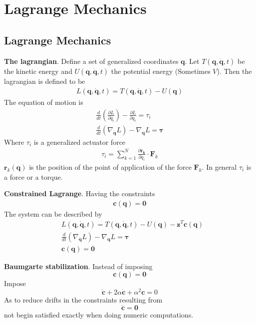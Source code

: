 \setcounter{section}{3}
\section{Lagrange Mechanics}
\setcounter{section}{8}
\setcounter{subsection}{1}
\subsection{Lagrange Mechanics} %

\textbf{The lagrangian}. Define a set of generalized coordinates \(\bm{q}\). Let
 \(T(\bm{q},\dot{\bm{q}},t)\) be the kinetic energy and 
\(U(\bm{q},\bm{\dot{q}},t)\) the potential energy (Sometimes \(V\)). Then the lagrangian is
defined to be
\begin{align*}
    L(\bm{q},\dot{\bm{q}},t) = T(\bm{q},\dot{\bm{q}},t)-U(\bm{q})
\end{align*}
The equation of motion is
\begin{align*}
    \frac{d}{dt}\left(\frac{\partial L}{\partial \dot{q_i}}\right) - \frac{\partial L}{\partial q_i} = \tau_i \\
    \frac{d}{dt}\left(\nabla_{\dot{\bm{q}}}L\right) - \nabla_{\bm{q}}L = \bm{\tau}
\end{align*}
Where \(\tau_i\) is a generalized actuator force
\begin{align*}
    \tau_i = \sum_{k=1}^{N}\frac{\partial \bm{r_k}}{\partial q_i} \cdot \bm{F}_k
\end{align*}
\(\bm{r}_k(\bm{q})\) is the position of the point of application of the force \(\bm{F}_k\).
In general \(\tau_i\) is a force or a torque.
\newline

\textbf{Constrained Lagrange}. Having the constraints
\begin{align*}
    \bm{c}(\bm{q}) = \bm{0}
\end{align*}
The system can be described by
\begin{align*}
    & L(\bm{q},\dot{\bm{q}},t) = T(\bm{q},\dot{\bm{q}},t)-U(\bm{q})  - \bm{z}^T\bm{c}(\bm{q}) \\
    & \frac{d}{dt}\left(\nabla_{\dot{\bm{q}}}L\right) - \nabla_{\bm{q}}L = \bm{\tau} \\
    & \bm{c}(\bm{q}) = \bm{0}
\end{align*}

\textbf{Baumgarte stabilization}. Instead of imposing
\[\bm{c}(\bm{q}) =\bm{0}\]
Impose
\[\ddot{\bm{c}}+2\alpha\dot{\bm{c}}+\alpha^2\bm{c} = 0\]
As to reduce drifts in the constraints resulting from 
\[\ddot{\bm{c}}=\bm{0}\]
not begin satisfied exactly when doing numeric computations.

